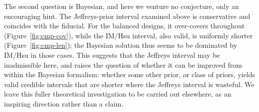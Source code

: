 \documentclass[12pt]{article}
\begin{document}
The second question is Bayesian, and here we venture no conjecture, only an
encouraging hint.  The Jeffreys-prior interval examined above is conservative and
coincides with the fiducial.  For the balanced designs, it over-covers throughout
(Figure~\ref{fig:cmp-cov}), while the IM/Hsu interval, also valid, is uniformly
shorter (Figure~\ref{fig:cmp-len}); the Bayesian solution thus seems to be
dominated by IM/Hsu in those cases.  This suggests that the Jeffreys interval may be inadmissible here, and raises the
question of whether it can be improved from within the Bayesian formalism: whether
some other prior, or class of priors, yields valid credible intervals that are
shorter where the Jeffreys interval is wasteful.  We leave this fuller theoretical
investigation to be carried out elsewhere, as an inspiring direction rather than a
claim.
\end{document}
